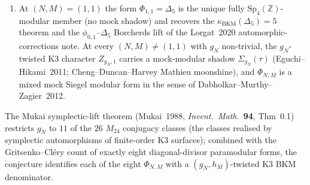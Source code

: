 \begin{conjecture}
\begin{enumerate}
\item At $(N, M) = (1, 1)$ the form $\Phi_{1, 1} = \Delta_5$ is
the unique fully $\mathrm{Sp}_4(\mathbb Z)$-modular member
\textup{(}no mock shadow\textup{)} and recovers
the $\kappa_{\mathrm{BKM}}(\Delta_5)=5$ theorem and the
$\phi_{0,1}$--$\Delta_5$ Borcherds lift of the Lorgat~\textup{2020}
automorphic-corrections note. At every
$(N, M) \ne (1, 1)$ with $g_N$ non-trivial, the $g_N$-twisted
K3 character $Z_{g_N, 1}$ carries a mock-modular shadow
$\Sigma_{g_N}(\tau)$ \textup{(}Eguchi--Hikami~\textup{2011}; Cheng--Duncan--Harvey
Mathieu moonshine\textup{)}, and $\Phi_{N, M}$ is a
mixed mock Siegel modular form in the sense of
Dabholkar--Murthy--Zagier~\textup{2012}.
\end{enumerate}
The Mukai symplectic-lift theorem \textup{(}Mukai~\textup{1988},
\textit{Invent.\ Math.}\ \textbf{94}, Thm~\textup{0.1}\textup{)}
restricts $g_N$ to $11$ of the $26$ $M_{24}$ conjugacy classes
\textup{(}the classes realised by symplectic automorphisms of
finite-order K3 surfaces\textup{)}; combined with the
Gritsenko--Cl\'ery count of exactly eight
diagonal-divisor paramodular forms, the conjecture identifies
each of the eight $\Phi_{N, M}$ with a $(g_N, h_M)$-twisted
K3 BKM denominator.
\end{conjecture}

